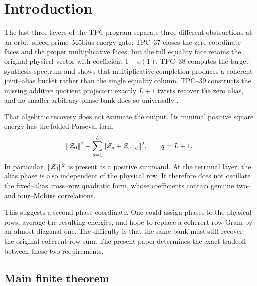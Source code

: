 \section{Introduction}
\label{sec:tpc40-introduction}

The last three layers of the TPC program separate three different
obstructions at an orbit--sliced prime--M\"obius energy gate.  TPC--37
closes the zero coordinate faces and the proper multiplicative faces, but
the full equality face retains the original physical vector with
coefficient \(1-o(1)\).  TPC--38 computes the target--synthesis spectrum
and shows that multiplicative completion produces a coherent joint--alias
bucket rather than the single equality column.  TPC--39 constructs the
missing additive quotient projector: exactly \(L+1\) twists recover the
zero alias, and no smaller arbitrary phase bank does so universally
\citep{WangTPC37,WangTPC38,WangTPC39}.

That algebraic recovery does not estimate the output.  Its minimal
positive square energy has the folded Parseval form
\begin{equation}
 \|\mathcal Z_0\|^2+
 \sum_{s=1}^{L}\|\mathcal Z_s+\mathcal Z_{s-q}\|^2,
 \qquad q=L+1.
 \label{eq:tpc40-intro-folded-energy}
\end{equation}
In particular, \(\|\mathcal Z_0\|^2\) is present as a positive summand.  At the
terminal layer, the alias phase is also independent of the physical row.
It therefore does not oscillate the fixed--alias cross--row quadratic
form, whose coefficients contain genuine two-- and four--M\"obius
correlations.

This suggests a second phase coordinate.  One could assign phases to the
physical rows, average the resulting energies, and hope to replace a
coherent row Gram by an almost diagonal one.  The difficulty is that the
same bank must still recover the original coherent row sum.  The present
paper determines the exact tradeoff between those two requirements.

\subsection{Main finite theorem}

